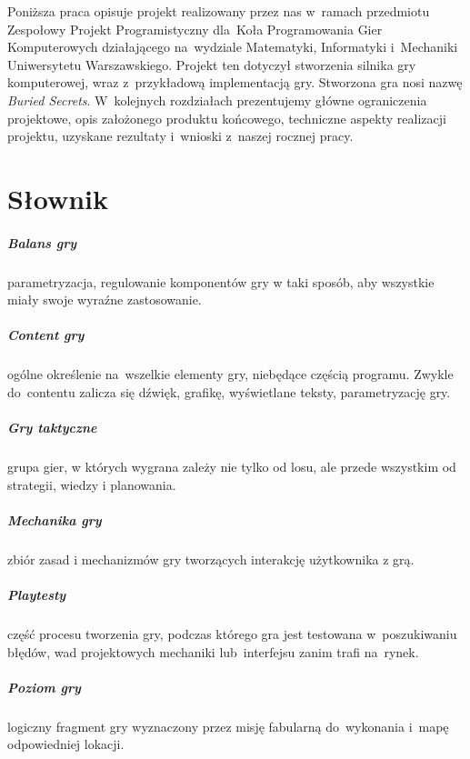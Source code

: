\documentclass[licencjacka]{pracamgr}
\begin{document}
  Poniższa praca opisuje projekt realizowany przez nas w~ramach przedmiotu Zespołowy Projekt Programistyczny dla~Koła
  Programowania Gier Komputerowych\cite{PROGRY} działającego na~wydziale Matematyki, Informatyki i~Mechaniki Uniwersytetu
  Warszawskiego. Projekt ten dotyczył stworzenia silnika gry komputerowej, wraz z~przykładową implementacją gry.
  Stworzona gra nosi nazwę \emph{Buried Secrets}. W~kolejnych rozdziałach prezentujemy główne ograniczenia projektowe,
  opis założonego produktu końcowego, techniczne aspekty realizacji projektu, uzyskane rezultaty i~wnioski z~naszej
  rocznej pracy.

\chapter{Słownik}
  \paragraph{Balans gry}
    parametryzacja, regulowanie komponentów gry w taki sposób, aby wszystkie miały swoje wyraźne zastosowanie.
  \paragraph{Content gry}
    ogólne określenie na~wszelkie elementy gry, niebędące częścią programu. Zwykle do~contentu zalicza się dźwięk,
    grafikę, wyświetlane teksty, parametryzację gry.
  \paragraph{Gry taktyczne}
    grupa gier, w których wygrana zależy nie tylko od losu, ale przede wszystkim od strategii, wiedzy i planowania.
  \paragraph{Mechanika gry}
    zbiór zasad i mechanizmów gry tworzących interakcję użytkownika z grą. 
  \paragraph{Playtesty}
    część procesu tworzenia gry, podczas którego gra jest testowana w~poszukiwaniu błędów, wad projektowych mechaniki
    lub~interfejsu zanim trafi na~rynek.
  \paragraph{Poziom gry}
    logiczny fragment gry wyznaczony przez misję fabularną do~wykonania i~mapę odpowiedniej lokacji.
\end{document}
